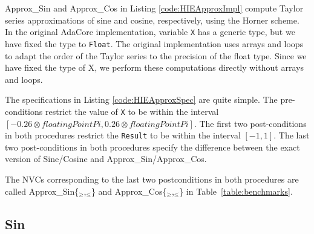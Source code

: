 \documentclass[runningheads]{llncs}
\begin{document}
Approx\_Sin and Approx\_Cos in Listing \ref{code:HIEApproxImpl} compute Taylor series approximations of sine and cosine, respectively, using the Horner scheme.
%
In the original AdaCore implementation, variable \lstinline{X} has a generic type, but 
we have fixed the type to \lstinline{Float}.
The original implementation uses arrays and loops to adapt the order of the Taylor series to the precision of the float type.
Since we have fixed the type of X, we perform these computations directly without arrays and loops.

The specifications in Listing \ref{code:HIEApproxSpec} are quite simple.
The pre-conditions restrict the value of \lstinline{X} to be within the interval $[-0.26 \otimes \textit{floatingPointPi}, 0.26 \otimes \textit{floatingPointPi}]$.
The first two post-conditions in both procedures restrict the \lstinline{Result} to be within the interval $[-1,1]$.
The last two post-conditions in both procedures specify the difference between the exact version of Sine/Cosine and Approx\_Sin/Approx\_Cos.


The NVCs corresponding to the last two postconditions in both procedures
are called Approx\_Sin\{${}_\ge$,${}_\le$\} and Approx\_Cos\{${}_\ge$,${}_\le$\} in Table~\ref{table:benchmarks}.

\subsection{Sin}
\end{document}
